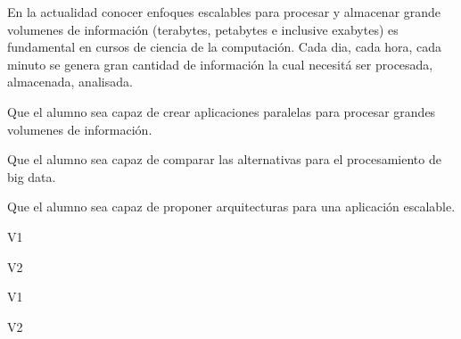 \begin{syllabus}


\begin{justification}
En la actualidad conocer enfoques escalables para procesar y almacenar grande volumenes de información (terabytes, petabytes e inclusive exabytes) es fundamental en cursos de ciencia de la computación. Cada dia, cada hora, cada minuto se genera gran cantidad de información la cual necesitá ser procesada, almacenada, analisada.
\end{justification}

\begin{goals}
\item Que el alumno sea capaz de crear aplicaciones paralelas para procesar grandes volumenes de información.
\item Que el alumno sea capaz de comparar las alternativas para el procesamiento de big data.
\item Que el alumno sea capaz de proponer arquitecturas para una aplicación escalable.
\end{goals}

\begin{outcomes}{V1}
    \item {} 
    \item {} 
    \item {} 
    \item {} 
\end{outcomes}

\begin{outcomes}{V2}
    \item {}
    \item {} 
    \item {} 
\end{outcomes}

\begin{competences}{V1}
    \item {}
    \item {} 
    \item {} 
    \item {} 
    \item {} 
\end{competences}

\begin{competences}{V2}
    \item {}
    \item {} 
    \item {} 
    \item {} 
    \item {} 
\end{competences}


\end{syllabus}
